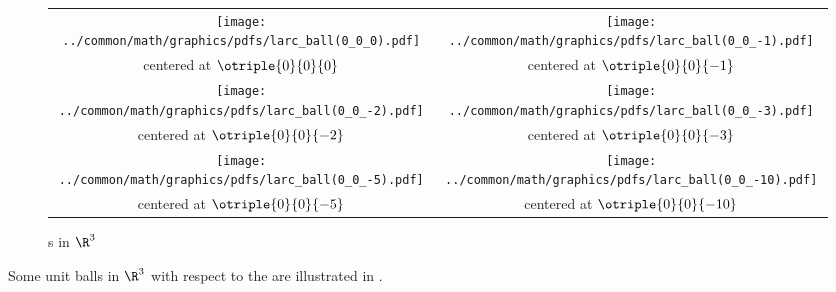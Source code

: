 \begin{figure}
  \centering%
  \begin{tabstr}{0.75}\begin{tabular}{cc}
        \texttt{[image: ../common/math/graphics/pdfs/larc\_ball(0\_0\_0).pdf]} 
      & \texttt{[image: ../common/math/graphics/pdfs/larc\_ball(0\_0\_-1).pdf]} 
      \\centered at $\otriple{0}{0}{0}$
      & centered at $\otriple{0}{0}{-1}$
    \\
        \texttt{[image: ../common/math/graphics/pdfs/larc\_ball(0\_0\_-2).pdf]} 
      & \texttt{[image: ../common/math/graphics/pdfs/larc\_ball(0\_0\_-3).pdf]} 
      \\centered at $\otriple{0}{0}{-2}$
      & centered at $\otriple{0}{0}{-3}$
    \\
        \texttt{[image: ../common/math/graphics/pdfs/larc\_ball(0\_0\_-5).pdf]} 
      & \texttt{[image: ../common/math/graphics/pdfs/larc\_ball(0\_0\_-10).pdf]} 
      \\centered at $\otriple{0}{0}{-5}$
      & centered at $\otriple{0}{0}{-10}$
  \end{tabular}\end{tabstr}
  \caption{s in $\R^3$ \label{fig:larcR3}}
\end{figure}
\begin{example}
\label{ex:larcR3balls}
Some unit balls in $\R^3$ with respect to the  are illustrated in .
\end{example}





